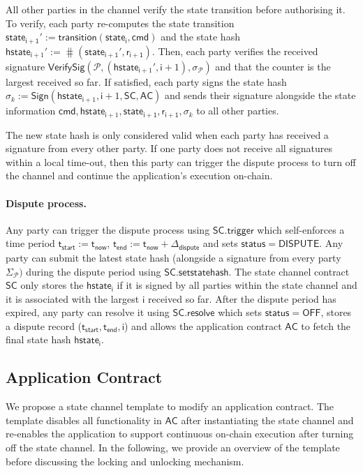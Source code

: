 \documentclass{llncs}
\newcommand{\chanstatus}{\mathsf{status}}
\newcommand{\chandispute}{\mathsf{DISPUTE}}
\newcommand{\chanoff}{\mathsf{OFF}}
\newcommand{\cmd}{\mathsf{cmd}}
\newcommand{\hstatei}{\mathsf{hstate}_{\monotoniccounter}}
\newcommand{\hstateplus}{\ensuremath{\mathsf{hstate}_{\monotoniccounter+1}}}
\newcommand{\monotoniccounter}{\mathsf{i}}
\newcommand{\stateinfoi}{\mathsf{state}_{\mathsf{i}}}
\newcommand{\stateinfoplus}{\mathsf{state}_{\mathsf{i+1}}}
\newcommand{\participant}{\mathcal{P}}
\newcommand{\ranplus}{\mathsf{r}_{\mathsf{i+1}}}
\newcommand{\statechannel}{\mathsf{SC}}
\newcommand{\statechanneldispute}{\mathsf{SC}.\mathsf{trigger}}
\newcommand{\statechannelsetstate}{\mathsf{SC}.\mathsf{setstatehash}}
\newcommand{\statechannelresolve}{\mathsf{SC}.\mathsf{resolve}}
\newcommand{\sign}{\mathsf{Sign}}
\newcommand{\verifysig}{\mathsf{VerifySig}}
\newcommand{\appcontract}{\mathsf{AC}}
\newcommand{\timenow}{\mathsf{t}_{\mathsf{now}}}
\newcommand{\timestart}{\mathsf{t}_{\mathsf{start}}}
\newcommand{\timeend}{\mathsf{t}_{\mathsf{end}}}
\newcommand{\timedispute}{\timenow + \mathsf{\Delta}_{\mathsf{dispute}}}
\begin{document}
All other parties in the channel verify the state transition before authorising it. 
To verify, each party re-computes the state transition $\stateinfoplus' := \mathsf{transition}(\stateinfoi, \cmd)$ and the state hash $\hstateplus' := \hash(\stateinfoplus', \ranplus)$.
Then, each party verifies the received signature $\verifysig(\participant, (\hstateplus', \monotoniccounter+1), \sigma_{\participant})$ and that the counter is the largest received so far. 
If satisfied, each party signs the state hash  $\sigma_{k} := \sign(\hstateplus,\monotoniccounter+1, \statechannel, \appcontract)$ and sends their signature alongside the state information $\cmd,\hstateplus, \stateinfoplus, \ranplus, \sigma_{k}$ to all other parties. 

The new state hash is only considered valid when each party has received a signature from every other party.  If one party does not receive all signatures within a local time-out, then this party can trigger the dispute process to turn off the channel and continue the application's execution on-chain. 

\paragraph{Dispute process.} 

Any party can trigger the dispute process using $\statechanneldispute$ which self-enforces a time period $\timestart := \timenow$, $\timeend := \timedispute$ and sets $\chanstatus = \chandispute$. 
Any party can submit the latest state hash (alongside a signature from every party $\Sigma_{\participant})$ during the dispute period using $\statechannelsetstate$. 
The state channel contract $\statechannel$ only stores the $\hstatei$ if it is  signed by all parties within the state channel and it is  associated with the largest $\monotoniccounter$ received so far. 
After the dispute period has expired, any party can resolve it using $\statechannelresolve$ which sets $\chanstatus = \chanoff$, stores a dispute record ($\timestart,\timeend, \monotoniccounter$) and allows the application contract $\appcontract$ to fetch the final state hash $\hstatei$. 

\subsection{Application Contract}

We propose a state channel template to modify an application contract. 
The template disables all functionality in $\appcontract$  after instantiating the state channel and re-enables the application to support continuous on-chain execution after turning off the state channel. 
In the following, we provide an overview of the template before discussing the locking and unlocking mechanism. 
\end{document}
